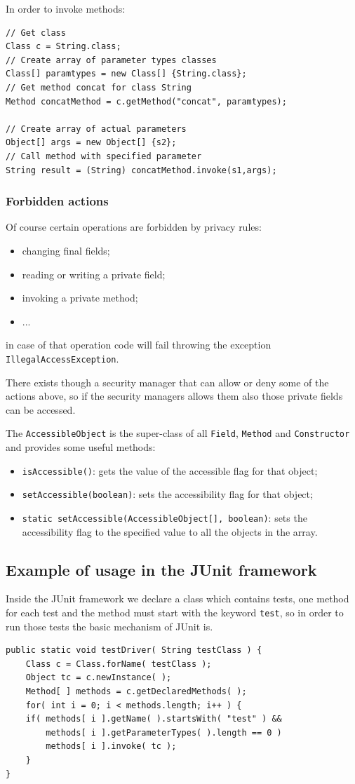 In order to invoke methods:
\begin{verbatim}
// Get class
Class c = String.class;
// Create array of parameter types classes
Class[] paramtypes = new Class[] {String.class};
// Get method concat for class String
Method concatMethod = c.getMethod("concat", paramtypes);

// Create array of actual parameters
Object[] args = new Object[] {s2};
// Call method with specified parameter
String result = (String) concatMethod.invoke(s1,args);
\end{verbatim}

\subsubsection{Forbidden actions}
Of course certain operations are forbidden by privacy rules:
\begin{itemize}
    \item changing final fields;
    \item reading or writing a private field;
    \item invoking a private method;
    \item ...
\end{itemize}
in case of that operation code will fail throwing the exception \verb|IllegalAccessException|.

There exists though a security manager that can allow or deny some of the actions above, so if the security managers allows them also those private fields can be accessed.

The \verb|AccessibleObject| is the super-class of all \verb|Field|, \verb|Method| and \verb|Constructor| and provides some useful methods:
\begin{itemize}
    \item \verb|isAccessible()|: gets the value of the accessible flag for that object;
    \item \verb|setAccessible(boolean)|: sets the accessibility flag for that object;
    \item \verb|static setAccessible(AccessibleObject[], boolean)|: sets the accessibility flag to the specified value to all the objects in the array.
\end{itemize}


\subsection{Example of usage in the JUnit framework}
Inside the JUnit framework we declare a class which contains tests, one method for each test and the method must start with the keyword \verb|test|, so in order to run those tests the basic mechanism of JUnit is.
\begin{verbatim}
public static void testDriver( String testClass ) {
    Class c = Class.forName( testClass );
    Object tc = c.newInstance( );
    Method[ ] methods = c.getDeclaredMethods( );
    for( int i = 0; i < methods.length; i++ ) {
    if( methods[ i ].getName( ).startsWith( "test" ) &&
        methods[ i ].getParameterTypes( ).length == 0 )
        methods[ i ].invoke( tc );
    }
}
\end{verbatim}


